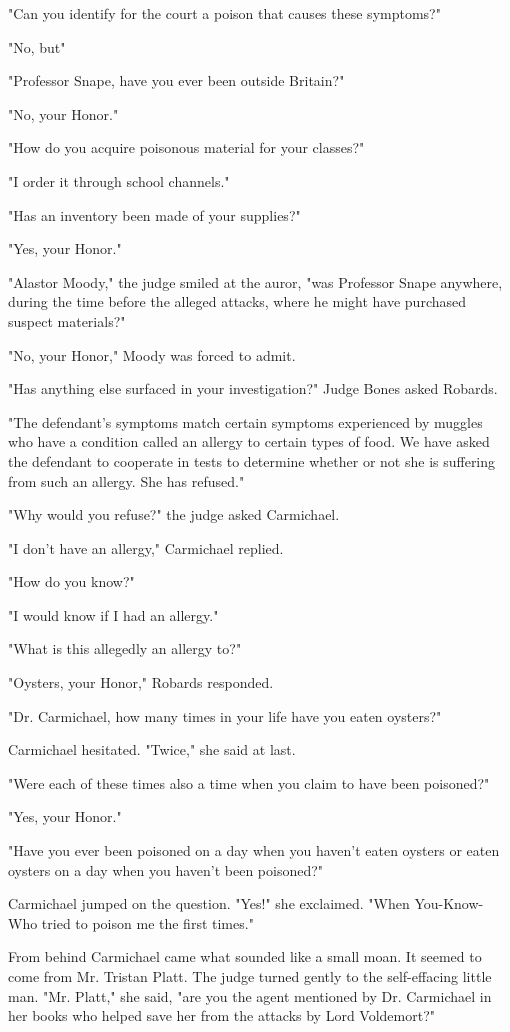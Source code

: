 "Can you identify for the court a poison that causes these symptoms?"

"No, but{\el}"

"Professor Snape, have you ever been outside Britain?"

"No, your Honor."

"How do you acquire poisonous material for your classes?"

"I order it through school channels."

"Has an inventory been made of your supplies?"

"Yes, your Honor."

"Alastor Moody," the judge smiled at the auror, "was Professor Snape anywhere, during the time before the alleged attacks, where he might have purchased suspect materials?"

"No, your Honor," Moody was forced to admit.

"Has anything else surfaced in your investigation?" Judge Bones asked Robards.

"The defendant's symptoms match certain symptoms experienced by muggles who have a condition called an allergy to certain types of food. We have asked the defendant to cooperate in tests to determine whether or not she is suffering from such an allergy. She has refused."

"Why would you refuse?" the judge asked Carmichael.

"I don't have an allergy," Carmichael replied.

"How do you know?"

"I would know if I had an allergy."

"What is this allegedly an allergy to?"

"Oysters, your Honor," Robards responded.

"Dr. Carmichael, how many times in your life have you eaten oysters?"

Carmichael hesitated. "Twice," she said at last.

"Were each of these times also a time when you claim to have been poisoned?"

"Yes, your Honor."

"Have you ever been poisoned on a day when you haven't eaten oysters or eaten oysters on a day when you haven't been poisoned?"

Carmichael jumped on the question. "Yes!" she exclaimed. "When You-Know-Who tried to poison me the first times."

From behind Carmichael came what sounded like a small moan. It seemed to come from Mr. Tristan Platt. The judge turned gently to the self-effacing little man. "Mr. Platt," she said, "are you the agent mentioned by Dr. Carmichael in her books who helped save her from the attacks by Lord Voldemort?"

